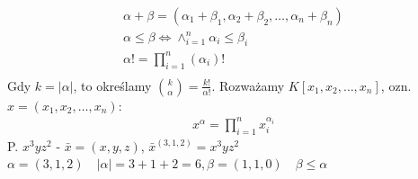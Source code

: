 \documentclass{article}
\numberwithin{equation}{subsection}
\begin{document}
\begin{align*}
    \alpha + \beta = (\alpha_1 + \beta_1, \alpha_2 + \beta_2, \dots, \alpha_n + \beta_n)\\
    \alpha \leq \beta \iff \land_{i=1}^{n} \alpha_i \leq \beta_i\\
    \alpha! = \prod_{i=1}^{n} (\alpha_i)!\\
\end{align*}
Gdy $k=|\alpha|$, to określamy $\binom{k}{\alpha} = \frac{k!}{\alpha!}$. Rozważamy $K[x_1, x_2, \dots, x_n]$,
ozn. $x=(x_1, x_2, \dots, x_n)$:
\begin{align*}
    x^{\alpha} = \prod_{i=1}^{n} x_i^{\alpha_i}
\end{align*}
P. $x^3yz^2$ - $\bar{x} = (x,y,z)$, $\bar{x}^{(3,1,2)} = x^3yz^2$\\
$\alpha=(3,1,2)\quad |\alpha| = 3+1+2=6, \beta=(1,1,0) \quad \beta\leq \alpha$\\
\end{document}

